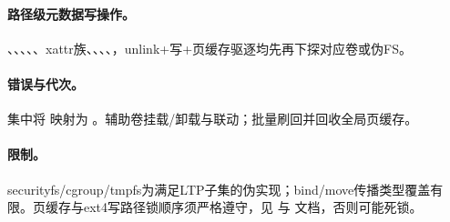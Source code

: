 \paragraph{路径级元数据写操作。}
、、、、、xattr族、、、、，unlink+写+页缓存驱逐均先再下探对应卷或伪FS。

\paragraph{错误与代次。}
集中将  映射为 。辅助卷挂载/卸载与联动；批量刷回并回收全局页缓存。

\paragraph{限制。}
securityfs/cgroup/tmpfs为满足LTP子集的伪实现；bind/move传播类型覆盖有限。页缓存与ext4写路径锁顺序须严格遵守，见  与  文档，否则可能死锁。

